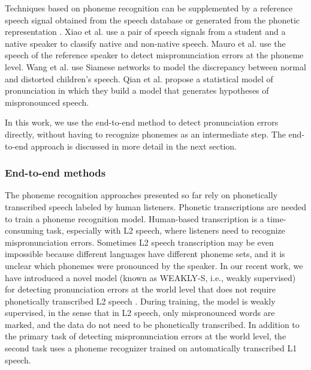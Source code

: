 \documentclass[]{interact}
\theoremstyle{plain}%
\theoremstyle{definition}
\theoremstyle{remark}
\begin{document}
Techniques based on phoneme recognition can be supplemented by a reference speech signal obtained  from the speech database \cite{xiao2018paired, nicolao2015automatic, wang2019child} or generated from the phonetic representation \cite{korzekwa2021mispronunciation, qian2010capturing}. Xiao et al. \cite{xiao2018paired} use a pair of speech signals from a student and a native speaker to classify native and non-native speech. Mauro et al. \cite{nicolao2015automatic} use the speech of the reference speaker to detect mispronunciation errors at the phoneme level. Wang et al. \cite{wang2019child} use Siamese networks to model the discrepancy between normal and distorted children's speech. Qian et al. \cite{qian2010capturing} propose a statistical  model of pronunciation in which they build a model that generates hypotheses of mispronounced speech. 

In this work, we use the end-to-end method to detect pronunciation errors directly, without having to recognize phonemes as an intermediate step. The end-to-end approach is discussed in more detail in the next section.

\subsubsection{End-to-end methods} 

The phoneme recognition approaches presented so far rely on phonetically transcribed speech labeled by human listeners. Phonetic transcriptions are needed to train a phoneme recognition model. Human-based transcription is a time-consuming task, especially with L2 speech, where listeners need to recognize mispronunciation errors. Sometimes L2 speech transcription may be even impossible because different languages have different phoneme sets, and it is unclear which phonemes were pronounced by the speaker. In our recent work, we have introduced a novel model (known as WEAKLY-S,  i.e., weakly supervised) for detecting pronunciation errors at the world level that does not require phonetically transcribed L2 speech \cite{korzekwa21b_interspeech}. During training, the model is weakly supervised, in the sense that in L2 speech, only mispronounced words are marked, and the data do not need to be phonetically transcribed. In addition to the primary task of detecting mispronunciation errors at the world level, the second task uses a phoneme recognizer trained on automatically transcribed L1 speech. 
\end{document}
